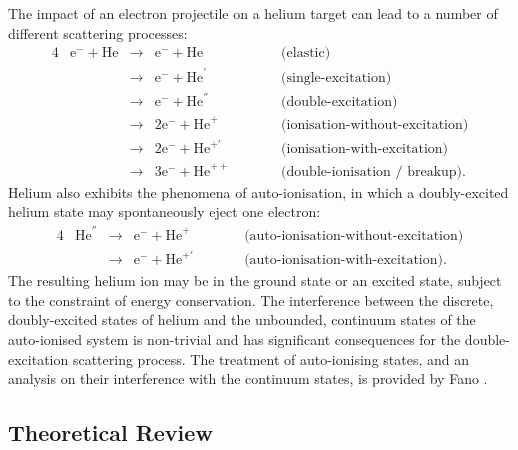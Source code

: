 \documentclass[]{article}
\begin{document}
The impact of an electron projectile on a helium target can lead to a number of
different scattering processes:
\begin{alignat*}{4}
  &
  \mathrm{e}^{-}
  +
  \mathrm{He}
  &
  {}\to{}
  &
  \mathrm{e}^{-}
  +
  \mathrm{He}
  &
  \quad\quad
  &
  \text{(elastic)}
  \\
  &
  &
  {}\to{}
  &
  \mathrm{e}^{-}
  +
  \mathrm{He}^{'}
  &
  &
  \text{(single-excitation)}
  \\
  &
  &
  {}\to{}
  &
  \mathrm{e}^{-}
  +
  \mathrm{He}^{''}
  &
  &
  \text{(double-excitation)}
  \\
  &
  &
  {}\to{}
  &
  2
  \mathrm{e}^{-}
  +
  \mathrm{He}^{+}
  &
  &
  \text{(ionisation-without-excitation)}
  \\
  &
  &
  {}\to{}
  &
  2
  \mathrm{e}^{-}
  +
  \mathrm{He}^{+'}
  &
  &
  \text{(ionisation-with-excitation)}
  \\
  &
  &
  {}\to{}
  &
  3
  \mathrm{e}^{-}
  +
  \mathrm{He}^{++}
  &
  &
  \text{(double-ionisation / breakup)}
  .
\end{alignat*}
Helium also exhibits the phenomena of auto-ionisation, in which a doubly-excited
helium state may spontaneously eject one electron:
\begin{alignat*}{4}
  &
  \mathrm{He}^{''}
  &
  {}\to{}
  &
  \mathrm{e}^{-}
  +
  \mathrm{He}^{+}
  &
  \quad\quad
  &
  \text{(auto-ionisation-without-excitation)}
  \\
  &
  &
  {}\to{}
  &
  \mathrm{e}^{-}
  +
  \mathrm{He}^{+'}
  &
  \quad\quad
  &
  \text{(auto-ionisation-with-excitation)}
  .
\end{alignat*}
The resulting helium ion may be in the ground state or an excited state,
subject to the constraint of energy conservation.
The interference between the discrete, doubly-excited states of helium and the
unbounded, continuum states of the auto-ionised system is non-trivial and has
significant consequences for the double-excitation scattering process.
The treatment of auto-ionising states, and an analysis on their interference
with the continuum states, is provided by Fano \cite{PhysRev.124.1866}.

\subsection{Theoretical Review}
\label{sec:in-th}
\end{document}

